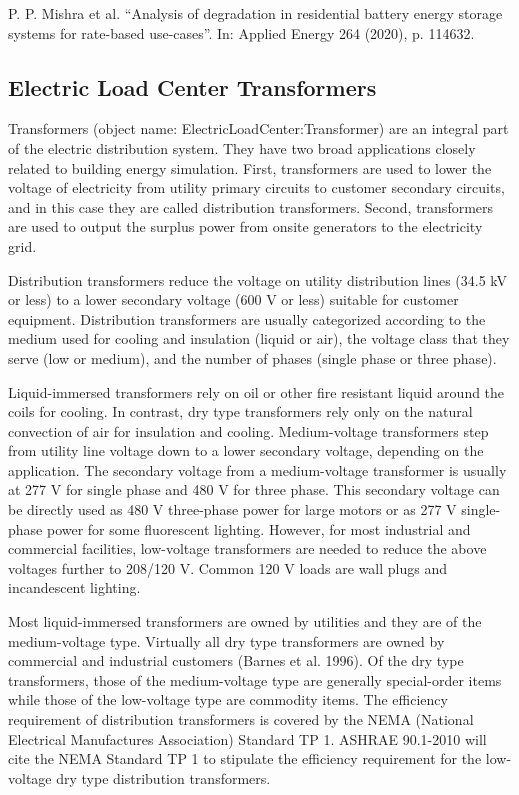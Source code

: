 \noindent
P. P. Mishra et al. “Analysis of degradation in residential battery energy storage systems for rate-based use-cases”. In: Applied Energy 264 (2020), p. 114632.

\subsection{Electric Load Center Transformers}\label{electric-load-center-transformers}

Transformers (object name: ElectricLoadCenter:Transformer) are an integral part of the electric distribution system. They have two broad applications closely related to building energy simulation. First, transformers are used to lower the voltage of electricity from utility primary circuits to customer secondary circuits, and in this case they are called distribution transformers. Second, transformers are used to output the surplus power from onsite generators to the electricity grid.

Distribution transformers reduce the voltage on utility distribution lines (34.5 kV or less) to a lower secondary voltage (600 V or less) suitable for customer equipment. Distribution transformers are usually categorized according to the medium used for cooling and insulation (liquid or air), the voltage class that they serve (low or medium), and the number of phases (single phase or three phase).

Liquid-immersed transformers rely on oil or other fire resistant liquid around the coils for cooling. In contrast, dry type transformers rely only on the natural convection of air for insulation and cooling. Medium-voltage transformers step from utility line voltage down to a lower secondary voltage, depending on the application. The secondary voltage from a medium-voltage transformer is usually at 277 V for single phase and 480 V for three phase. This secondary voltage can be directly used as 480 V three-phase power for large motors or as 277 V single-phase power for some fluorescent lighting. However, for most industrial and commercial facilities, low-voltage transformers are needed to reduce the above voltages further to 208/120 V. Common 120 V loads are wall plugs and incandescent lighting.

Most liquid-immersed transformers are owned by utilities and they are of the medium-voltage type. Virtually all dry type transformers are owned by commercial and industrial customers (Barnes et al. 1996). Of the dry type transformers, those of the medium-voltage type are generally special-order items while those of the low-voltage type are commodity items. The efficiency requirement of distribution transformers is covered by the NEMA (National Electrical Manufactures Association) Standard TP 1. ASHRAE 90.1-2010 will cite the NEMA Standard TP 1 to stipulate the efficiency requirement for the low-voltage dry type distribution transformers.

